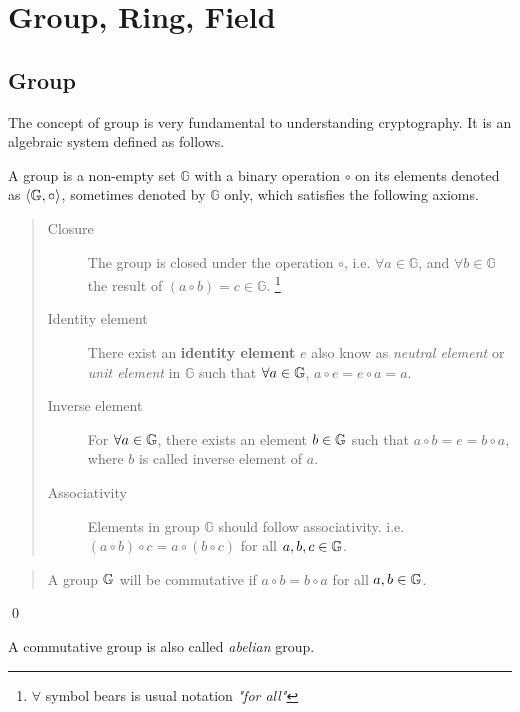 \section{Group, Ring, Field}
\label{sec:chap:fund:group}
\subsection{Group}
The concept of group  is very fundamental to understanding cryptography. It is an algebraic system defined as follows.
\begin{definition}
	A group  is a non-empty set $\mathbb{G}$ with a binary operation $\circ$ on its elements denoted as  $\langle\mathbb{G}\index{group},\circ\rangle$,  sometimes denoted by   $\mathbb{G}$ only, which satisfies the following axioms.
	\begin{quote}
		\begin{description}
			\item[Closure] The group is closed under the operation $\circ$, i.e.  $\forall a \in\mathbb{G}$, and $\forall b \in\mathbb{G}$ the result of $ (a\circ b) = c \in \mathbb{G}$. \footnote{$\forall$ symbol bears is usual notation \textit{"for all"} }
			
			\item[Identity element] There exist an \textbf{identity element } $e$ also know as \textit{neutral element} or \textit{unit element} in $\mathbb{G}$ such that $\forall a \in\mathbb{G} \index{group}$,  $a\circ e = e\circ a = a$.
			
			\item[Inverse element] For ${\forall}a \in\mathbb{G}\index{group}$, there exists an element $b\in\mathbb{G}\index{group}$ such that $a\circ b=e=b\circ a$, where $b$ is called inverse element of $a$.
			
			\item[Associativity] Elements in  group $\mathbb{G}$ should follow associativity. i.e. $(a\circ b)\circ c=a\circ (b\circ c)$ for all $ a,b,c\in\mathbb{G}\index{group}$.
			
		\end{description}
	\end{quote}
\end{definition}

\begin{definition} \hspace{0em}
	\begin{quote}\begin{description}
			A group  $\mathbb{G}\index{group}$ will be commutative if $a\circ b=b\circ a$ for all $a,b \in\mathbb{G}\index{group}$.
	\end{description}\end{quote}
	\qed
\end{definition}
A commutative group is also called \textit{abelian} group.

